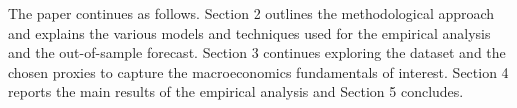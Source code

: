 The paper continues as follows. Section 2 outlines the methodological approach and explains the various models and techniques used for
the empirical analysis and the out-of-sample forecast. Section 3 continues exploring the dataset and the chosen proxies to capture the
macroeconomics fundamentals of interest. Section 4 reports the main results of the empirical analysis and Section 5 concludes.